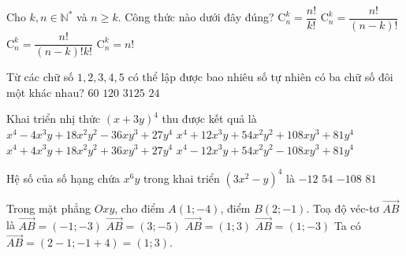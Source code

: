 \begin{ex}%
Cho $k, n \in \mathbb{N}^*$ và $n \geq k$. Công thức nào dưới đây đúng?
\choice
{$\mathrm{C}_n^k=\dfrac{n !}{k !}$}
{$\mathrm{C}_n^k=\dfrac{n !}{(n-k) !}$}
{\True $\mathrm{C}_n^k=\dfrac{n !}{(n-k) ! k !}$}
{$\mathrm{C}_n^k=n!$}
\end{ex}

\begin{ex}%
Từ các chữ số $1,2,3,4,5$ có thể lập được bao nhiêu số tự nhiên có ba chữ số đôi một khác nhau?
\choice
{\True $60$}
{$120$}
{$3125$}
{$24$}
\end{ex}

\begin{ex}%
Khai triển nhị thức $(x+3y)^4$ thu được kết quả là
\choice
{$x^4-4 x^3 y+18 x^2 y^2-36 x y^3+27 y^4$}
{\True $x^4+12 x^3 y+54 x^2 y^2+108 x y^3+81 y^4$}
{$x^4+4 x^3 y+18 x^2 y^2+36 x y^3+27 y^4$}
{$x^4-12 x^3 y+54 x^2 y^2-108 x y^3+81 y^4$}
\end{ex}

\begin{ex}%
Hệ số của số hạng chứa $x^6y$ trong khai triển $\left(3x^2-y\right)^4$ là
\choice
{$-12$}
{$54$}
{\True $-108$}
{$81$}
\end{ex}

\begin{ex}%
Trong mặt phẳng $Oxy$, cho điểm $A(1;-4)$, điểm $B(2;-1)$. Toạ độ véc-tơ $\vec{AB}$ là
\choice
{$\vec{AB}= (-1;-3)$}
{$\vec{AB}= (3;-5)$}
{\True $\vec{AB}= (1;3)$}
{$\vec{AB}= (1;-3)$}
\loigiai
{
Ta có $\vec{AB}= (2-1; -1+4)= (1;3)$.
}
\end{ex}

